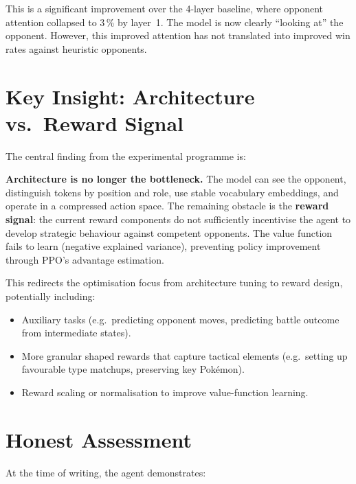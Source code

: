 This is a significant improvement over the 4-layer baseline, where opponent
attention collapsed to 3\,\% by layer~1.  The model is now clearly
``looking at'' the opponent.  However, this improved attention has not
translated into improved win rates against heuristic opponents.


\section{Key Insight: Architecture vs.\ Reward Signal}

The central finding from the experimental programme is:

\begin{keyinsight}
\textbf{Architecture is no longer the bottleneck.}  The model can see the
opponent, distinguish tokens by position and role, use stable vocabulary
embeddings, and operate in a compressed action space.  The remaining obstacle
is the \textbf{reward signal}: the current reward components do not
sufficiently incentivise the agent to develop strategic behaviour against
competent opponents.  The value function fails to learn (negative explained
variance), preventing policy improvement through PPO's advantage estimation.
\end{keyinsight}

This redirects the optimisation focus from architecture tuning to reward
design, potentially including:
\begin{itemize}
  \item Auxiliary tasks (e.g.\ predicting opponent moves, predicting battle
        outcome from intermediate states).
  \item More granular shaped rewards that capture tactical elements (e.g.\
        setting up favourable type matchups, preserving key Pok\'{e}mon).
  \item Reward scaling or normalisation to improve value-function learning.
\end{itemize}

\section{Honest Assessment}

At the time of writing, the agent demonstrates:


